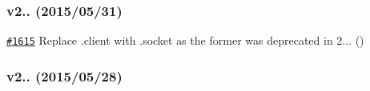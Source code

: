 \subsubsection*{v2.. (2015/05/31)}


\begin{DoxyItemize}
\item \href{https://github.com/request/request/pull/1615}{\tt \#1615} Replace \textquotesingle{}.client\textquotesingle{} with \textquotesingle{}.socket\textquotesingle{} as the former was deprecated in 2... ()
\end{DoxyItemize}

\subsubsection*{v2.. (2015/05/28)}


